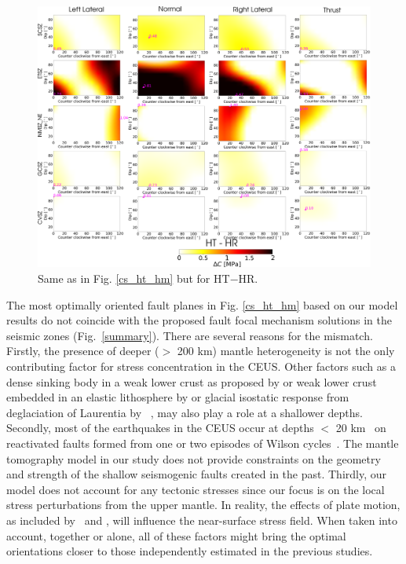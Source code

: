 \documentclass[draft,linenumbers]{agujournal2018}
\begin{document}
%
\begin{figure}[ht]
    \centering
    \includegraphics[width=\linewidth]{figures/ht_hr_summ.png}
    \caption{Same as in Fig. \ref{cs_ht_hm} but for HT$-$HR.}
    \label{cs_ht_hr}
\end{figure}

     The most optimally oriented fault planes in Fig. \ref{cs_ht_hm} based on our model results do not coincide with the proposed fault focal mechanism solutions in the seismic zones (Fig.~\ref{summary}). There are several reasons for the mismatch. Firstly, the presence of deeper ($>$ 200 km) mantle heterogeneity is not the only contributing factor for stress concentration in the CEUS. Other factors such as a dense sinking body in a weak lower crust as proposed by \citet{Pollitz_2001} or weak lower crust embedded in an elastic lithosphere by \citet{Kenner_2000a} or glacial isostatic response from deglaciation of Laurentia by ~\citet{Grollimund_2001}, may also play a role at a shallower depths.  Secondly, most of the earthquakes in the CEUS occur at depths $<$ 20 km~\citep[e.g.,][]{bollinger1985seismicity, chiu1992imaging, powell2016grenville} on reactivated faults formed from one or two episodes of Wilson cycles~\citep{thomas2006tectonic, wolin2012mineral}. The mantle tomography model in our study does not provide constraints on the geometry and strength of the shallow seismogenic faults created in the past. Thirdly, our model does not account for any tectonic stresses since our focus is on the local stress perturbations from the upper mantle. In reality, the effects of plate motion, as included by~\citet{zhan2016stress} and \citet{levandowski2016dense}, will influence the near-surface stress field. When taken into account, together or alone, all of these factors might bring the optimal orientations closer to those independently estimated in the previous studies.
     
\end{document}
